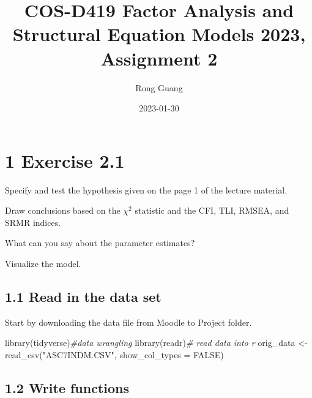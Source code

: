\documentclass[
]{article}
\title{COS-D419 Factor Analysis and Structural Equation Models 2023,
Assignment 2}
\author{Rong Guang}
\date{2023-01-30}
\newenvironment{Shaded}{\begin{snugshade}}{\end{snugshade}}
\newcommand{\AttributeTok}[1]{\textcolor[rgb]{0.77,0.63,0.00}{#1}}
\newcommand{\CommentTok}[1]{\textcolor[rgb]{0.56,0.35,0.01}{\textit{#1}}}
\newcommand{\ConstantTok}[1]{\textcolor[rgb]{0.00,0.00,0.00}{#1}}
\newcommand{\FunctionTok}[1]{\textcolor[rgb]{0.00,0.00,0.00}{#1}}
\newcommand{\NormalTok}[1]{#1}
\newcommand{\OtherTok}[1]{\textcolor[rgb]{0.56,0.35,0.01}{#1}}
\newcommand{\StringTok}[1]{\textcolor[rgb]{0.31,0.60,0.02}{#1}}
\begin{document}
\maketitle

\hypertarget{exercise-2.1}{%
\section{1 Exercise 2.1}\label{exercise-2.1}}

Specify and test the hypothesis given on the page 1 of the lecture
material.

Draw conclusions based on the \(\chi^2\) statistic and the CFI, TLI,
RMSEA, and SRMR indices.

What can you say about the parameter estimates?

Visualize the model.

\hypertarget{read-in-the-data-set}{%
\subsection{1.1 Read in the data set}\label{read-in-the-data-set}}

Start by downloading the data file from Moodle to Project folder.

\begin{Shaded}
\begin{Highlighting}[]
\FunctionTok{library}\NormalTok{(tidyverse)}\CommentTok{\#data wrangling }
\FunctionTok{library}\NormalTok{(readr)}\CommentTok{\# read data into r}
\NormalTok{orig\_data }\OtherTok{\textless{}{-}} \FunctionTok{read\_csv}\NormalTok{(}\StringTok{"ASC7INDM.CSV"}\NormalTok{, }\AttributeTok{show\_col\_types =} \ConstantTok{FALSE}\NormalTok{) }
\end{Highlighting}
\end{Shaded}

\hypertarget{write-functions}{%
\subsection{1.2 Write functions}\label{write-functions}}
\end{document}
